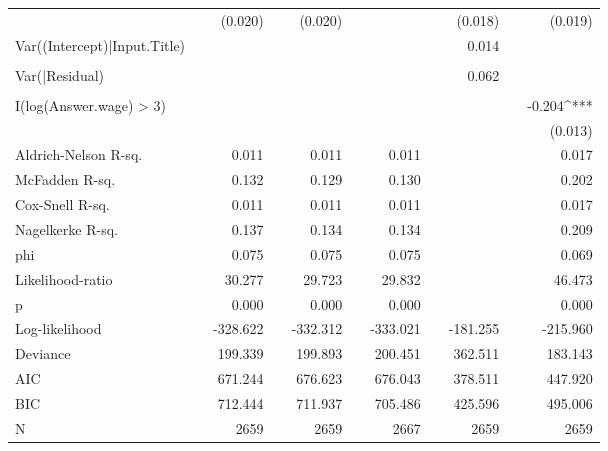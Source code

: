\begin{tabular}{lcD{.}{.}{7}cD{.}{.}{7}cD{.}{.}{7}cD{.}{.}{7}cD{.}{.}{7}}
                             &  &  (0.020)     &&  (0.020)     &&              &&  (0.018)     &&  (0.019)    \\
Var((Intercept)|Input.Title) &  &              &&              &&              &&   0.014      &&             \\
                             &  &              &&              &&              &&              &&             \\
Var(|Residual)               &  &              &&              &&              &&   0.062      &&             \\
                             &  &              &&              &&              &&              &&             \\
I(log(Answer.wage) > 3)      &  &              &&              &&              &&              && -0.204^{***}\\
                             &  &              &&              &&              &&              &&  (0.013)    \\
\midrule
Aldrich-Nelson R-sq.         &  &      0.011   &&      0.011   &&      0.011   &&              &&      0.017  \\
McFadden R-sq.               &  &      0.132   &&      0.129   &&      0.130   &&              &&      0.202  \\
Cox-Snell R-sq.              &  &      0.011   &&      0.011   &&      0.011   &&              &&      0.017  \\
Nagelkerke R-sq.             &  &      0.137   &&      0.134   &&      0.134   &&              &&      0.209  \\
phi                          &  &      0.075   &&      0.075   &&      0.075   &&              &&      0.069  \\
Likelihood-ratio             &  &     30.277   &&     29.723   &&     29.832   &&              &&     46.473  \\
p                            &  &      0.000   &&      0.000   &&      0.000   &&              &&      0.000  \\
Log-likelihood               &  &   -328.622   &&   -332.312   &&   -333.021   &&   -181.255   &&   -215.960  \\
Deviance                     &  &    199.339   &&    199.893   &&    200.451   &&    362.511   &&    183.143  \\
AIC                          &  &    671.244   &&    676.623   &&    676.043   &&    378.511   &&    447.920  \\
BIC                          &  &    712.444   &&    711.937   &&    705.486   &&    425.596   &&    495.006  \\
N                            &  &   2659       &&   2659       &&   2667       &&   2659       &&   2659      \\
\bottomrule
\end{tabular}
